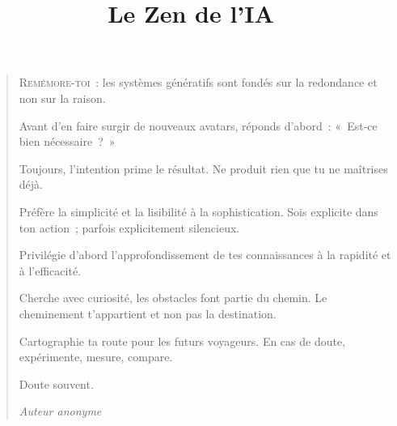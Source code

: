 \documentclass[12pt,a4paper]{article}
\title{Le Zen de l'IA}
\date{}
\author{}
\begin{document}
\maketitle
\thispagestyle{empty}

\begin{verse}
\onehalfspacing
\large 

\textsc{Remémore-toi}~: les systèmes génératifs sont fondés sur la redondance et non sur la raison. \par

Avant d'en faire surgir de nouveaux avatars, réponds d'abord~: «~Est-ce bien nécessaire~?~» \par

Toujours, l'intention prime le résultat. Ne produit rien que tu ne maîtrises déjà. \par

Préfère la simplicité et la lisibilité à la sophistication. Sois explicite dans ton action~; parfois explicitement silencieux. \par

Privilégie d'abord l'approfondissement de tes connaissances à la rapidité et à l'efficacité. \par

Cherche avec curiosité, les obstacles font partie du chemin. Le cheminement t'appartient et non pas la destination. \par

Cartographie ta route pour les futurs voyageurs. En cas de doute, expérimente, mesure, compare. \par

Doute souvent. \par

\vspace{1cm}

\begin{flushright}
	\textit{Auteur anonyme}
\end{flushright}

\end{verse}
\end{document}
